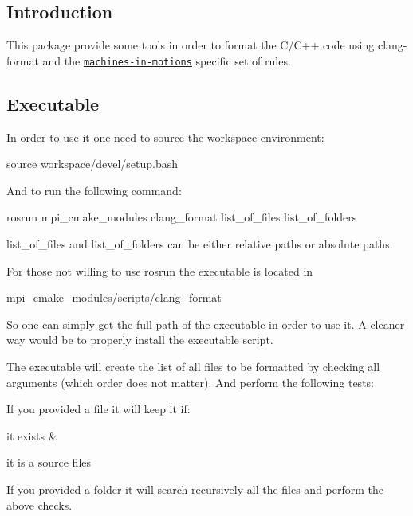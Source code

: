 \subsection*{Introduction}

This package provide some tools in order to format the C/\+C++ code using clang-\/format and the \href{https://machines-in-motion.github.io/code_documentation/ci_example_cpp/coding_guidelines_1.html}{\tt machines-\/in-\/motions} specific set of rules.

\subsection*{Executable}

In order to use it one need to source the workspace environment\+: \begin{DoxyVerb}source workspace/devel/setup.bash
\end{DoxyVerb}


And to run the following command\+: \begin{DoxyVerb}rosrun mpi_cmake_modules clang_format list_of_files list_of_folders
\end{DoxyVerb}


{\ttfamily list\+\_\+of\+\_\+files} and {\ttfamily list\+\_\+of\+\_\+folders} can be either relative paths or absolute paths.

For those not willing to use rosrun the executable is located in \begin{DoxyVerb}mpi_cmake_modules/scripts/clang_format
\end{DoxyVerb}


So one can simply get the full path of the executable in order to use it. A cleaner way would be to properly install the executable script.

The executable will create the list of all files to be formatted by checking all arguments (which order does not matter). And perform the following tests\+:
\begin{DoxyItemize}
\item If you provided a file it will keep it if\+:
\begin{DoxyItemize}
\item it exists \&
\item it is a source files
\end{DoxyItemize}
\item If you provided a folder it will search recursively all the files and perform the above checks.
\end{DoxyItemize}

